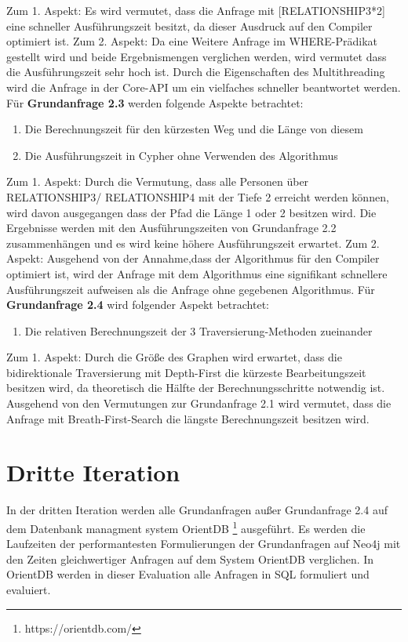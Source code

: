 Zum 1. Aspekt: Es wird vermutet, dass die Anfrage mit [RELATIONSHIP3*2] eine schneller Ausführungszeit besitzt, da dieser Ausdruck auf den Compiler optimiert ist. \newline
Zum 2. Aspekt: Da eine Weitere Anfrage im WHERE-Prädikat gestellt wird und beide Ergebnismengen verglichen werden, wird vermutet dass die Ausführungszeit sehr hoch ist. Durch die Eigenschaften des Multithreading wird die Anfrage in der Core-API um ein vielfaches schneller beantwortet werden. \newline  \newline
Für \textbf{Grundanfrage 2.3} werden folgende Aspekte betrachtet: 
\begin{enumerate}
	\item Die Berechnungszeit für den kürzesten Weg und die Länge von diesem
	\item Die Ausführungszeit in Cypher ohne Verwenden des Algorithmus
\end{enumerate}
Zum 1. Aspekt: Durch die Vermutung, dass alle Personen über RELATIONSHIP3/ RELATIONSHIP4 mit der Tiefe 2 erreicht werden können, wird davon ausgegangen dass der Pfad die Länge 1 oder 2 besitzen  wird. Die Ergebnisse werden mit den Ausführungszeiten von Grundanfrage 2.2 zusammenhängen und es wird keine höhere Ausführungszeit erwartet. \newline
Zum 2. Aspekt: Ausgehend von der Annahme,dass der Algorithmus für den Compiler optimiert ist, wird der Anfrage mit dem Algorithmus eine signifikant schnellere Ausführungszeit aufweisen als die Anfrage ohne gegebenen Algorithmus. \newline \newline
Für \textbf{Grundanfrage 2.4} wird folgender Aspekt betrachtet:
\begin{enumerate}
	\item Die relativen Berechnungszeit der 3 Traversierung-Methoden zueinander
\end{enumerate}
Zum 1. Aspekt: Durch die Größe des Graphen wird erwartet, dass die bidirektionale Traversierung mit Depth-First die kürzeste Bearbeitungszeit besitzen wird, da theoretisch die Hälfte der Berechnungsschritte notwendig ist. Ausgehend von den Vermutungen zur Grundanfrage 2.1 wird vermutet, dass die Anfrage mit Breath-First-Search die längste Berechnungszeit besitzen wird. 
\section{Dritte Iteration}
In der dritten Iteration werden alle Grundanfragen außer Grundanfrage 2.4 auf dem Datenbank managment system OrientDB \footnote{https://orientdb.com/} ausgeführt. Es werden die Laufzeiten der performantesten Formulierungen der Grundanfragen auf Neo4j mit den Zeiten gleichwertiger Anfragen auf dem System OrientDB verglichen. In OrientDB werden in dieser Evaluation alle Anfragen in SQL formuliert und evaluiert.  
